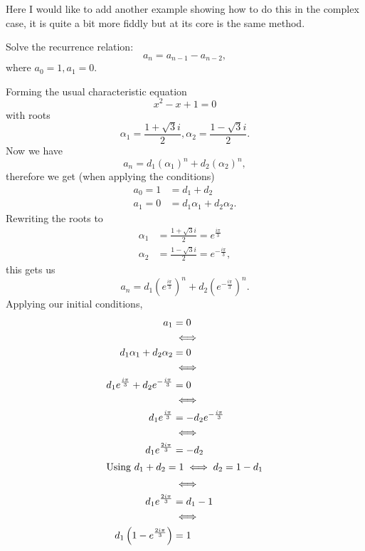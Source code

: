 \documentclass[10pt, a4paper]{article}
\begin{document}
Here I would like to add another example showing how to do this in the complex case,
it is quite a bit more fiddly but at its core is the same method.
\begin{example}
    Solve the recurrence relation:
    \[
    a_n = a_{n - 1} - a_{n - 2},
    \]
    where $a_0 = 1, a_1 = 0$.
    \begin{solution}
        Forming the usual characteristic equation
        \[
        x ^ 2 - x + 1 = 0
        \]
        with roots
        \[
        \alpha_1 = \frac{1 + \sqrt{3}i}{2}, \alpha_2 = \frac{1 - \sqrt{3}i}{2}.
        \]
        Now we have
        \[
        a_n = d_1(\alpha_1) ^ n + d_2(\alpha_2) ^ n,
        \]
        therefore we get
        (when applying the conditions)
        \begin{align*}
            a_0 = 1 &= d_1 + d_2 \\
            a_1 = 0 &= d_1\alpha_1 + d_2\alpha_2.
        \end{align*}
        Rewriting the roots to
        \begin{align*}
            \alpha_1 &= \frac{1 + \sqrt{3}i}{2} = e ^ {\frac{i\pi}{3}} \\
            \alpha_2 &= \frac{1 - \sqrt{3}i}{2} = e ^ {-\frac{i\pi}{3}},
        \end{align*}
        this gets us
        \[
        a_n = d_1\left(e ^ {\frac{i\pi}{3}}\right) ^ n + d_2\left(e ^ {-\frac{i\pi}{3}}\right) ^ n.
        \]
        Applying our initial conditions,
        \begin{align*}
            a_1 &= 0 \\
            &\iff \\
            d_1\alpha_1 + d_2\alpha_2 &= 0 \\
            &\iff \\
            d_1e ^ {\frac{i\pi}{3}} + d_2e ^ {-\frac{i\pi}{3}} &= 0 \\
            &\iff \\
            d_1e ^ {\frac{i\pi}{3}} &= -d_2e ^ {-\frac{i\pi}{3}} \\
            &\iff \\
            d_1e ^ {\frac{2i\pi}{3}} &= -d_2 \\
            \intertext{Using $d_1 + d_2 = 1 \iff d_2 = 1 - d_1$}
            &\iff \\
            d_1e ^ {\frac{2i\pi}{3}} &= d_1 - 1 \\
            &\iff \\
            d_1\left(1 - e ^ {\frac{2i\pi}{3}}\right) &= 1 \\

\end{align*}
\end{solution}
\end{example}
\end{document}
